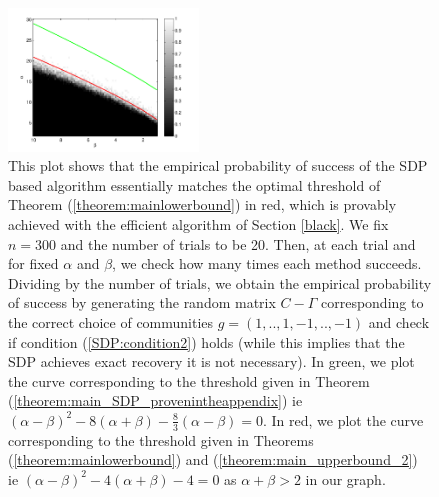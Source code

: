 \documentclass[english]{article}
\newcommand{\1}{\textbf{1}}
\begin{document}
\begin{figure}[h!]
\begin{center}
 \includegraphics[width=0.45\textwidth]{successprob3_correctaxis.pdf}  
\caption{
\label{Figure_Dualcertificate}
{\footnotesize{
This plot shows that the empirical probability of success of the SDP based algorithm essentially matches the optimal threshold of Theorem (\ref{theorem:mainlowerbound}) in red, which is provably achieved with the efficient algorithm of Section \ref{black}. 
We fix $n=300$ and the number of trials to be 20. Then, at each trial and for fixed $\alpha$ and $\beta$, we check how many times each method succeeds. Dividing by the number of trials, we obtain the empirical probability of success by generating the random matrix $C-\Gamma$ corresponding to the correct choice of communities $g=(1,..,1,-1,..,-1)$ and check if condition (\ref{SDP:condition2}) holds (while this implies that the SDP achieves exact recovery it is not necessary). 
In green, we plot the curve corresponding to the threshold given in Theorem (\ref{theorem:main_SDP_provenintheappendix}) ie $(\alpha-\beta)^2 -8(\alpha+\beta)-\frac83(\alpha-\beta)=0$. 
In red, we plot the curve corresponding to the threshold given in Theorems (\ref{theorem:mainlowerbound}) and (\ref{theorem:main_upperbound_2}) ie $(\alpha-\beta)^2 -4(\alpha+\beta)-4=0$ as $\alpha+\beta>2$ in our graph. %
}}}
\end{center}
\end{figure}
\end{document}
